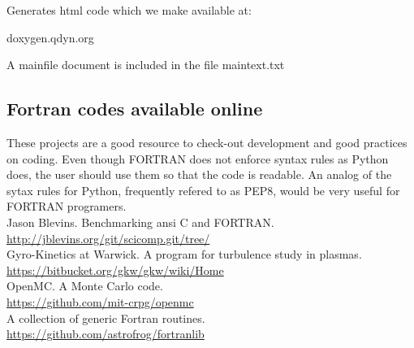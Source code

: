 \documentclass[10pt, oneside, pdftex]{article}
\begin{document}
Generates html code which we make available at:

doxygen.qdyn.org

A mainfile document is included in the file maintext.txt


\subsection{Fortran codes available online}
These projects are  a good resource to check-out  development and good
practices on coding. Even though FORTRAN does not enforce syntax rules
as  Python  does,  the user  should  use  them  so  that the  code  is
readable. An analog of the  sytax rules for Python, frequently refered
to as PEP8, would be very useful for FORTRAN programers. \\

Jason Blevins. Benchmarking ansi C and FORTRAN.\\
\url{http://jblevins.org/git/scicomp.git/tree/}\\

Gyro-Kinetics at Warwick. A program for turbulence study in plasmas.\\
\url{https://bitbucket.org/gkw/gkw/wiki/Home}\\

OpenMC. A Monte Carlo code.\\
\url{https://github.com/mit-crpg/openmc}\\

A collection of generic Fortran routines.\\
\url{https://github.com/astrofrog/fortranlib}\\



\end{document}
